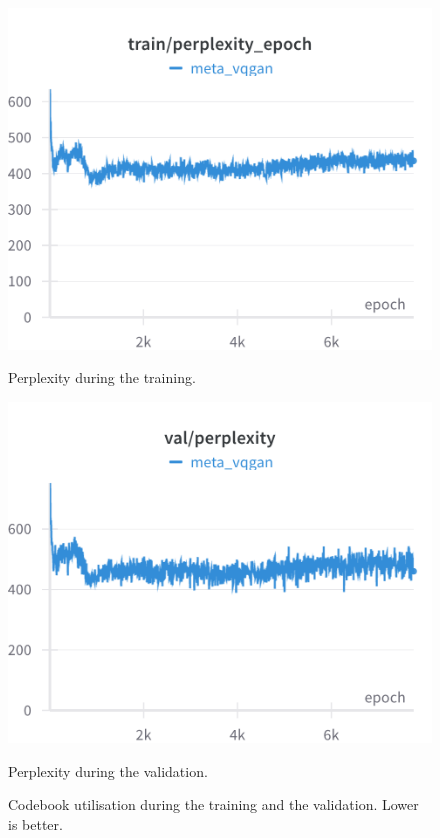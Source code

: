 \begin{figure}[H]
\includegraphics[width=\linewidth]{detailed_engineering/Meta VQGAN/charts/Section-2-Panel-1-5nrgzgmoj.png}
\caption{Perplexity during the training.}
\endminipage\hfill
{}
\includegraphics[width=\linewidth]{detailed_engineering/Meta VQGAN/charts/Section-4-Panel-1-njiwngfn7.png}
\caption{Perplexity during the validation.}
\endminipage
\caption{Codebook utilisation during the training and the validation. Lower is better.}
\end{figure}

